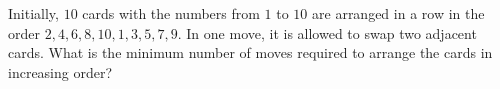 Initially, $10$ cards with the numbers from $1$ to $10$ are arranged in a row in the order $2, 4, 6, 8, 10, 1, 3, 5, 7, 9$. In one move, it is allowed to swap two adjacent cards. What is the minimum number of moves required to arrange the cards in increasing order?
